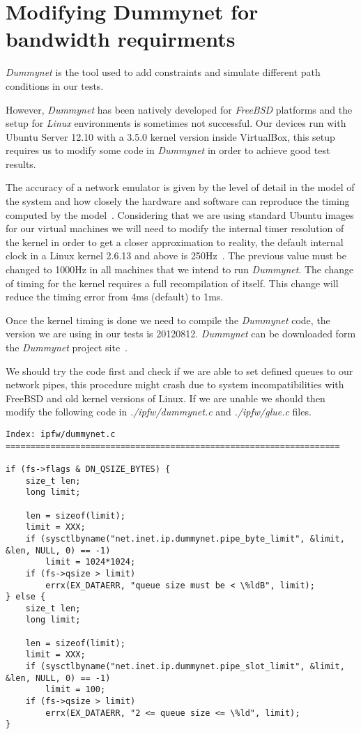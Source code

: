 \section{Modifying Dummynet for bandwidth requirments}
\label{sec:dummynet}

\thispagestyle{empty}

{\it Dummynet} is the tool used to add constraints and simulate different path conditions in our tests. 

However, {\it Dummynet} has been natively developed for {\it FreeBSD} platforms and the setup for {\it Linux} environments is sometimes not successful. Our devices run with Ubuntu Server 12.10 with a 3.5.0 kernel version inside VirtualBox, this setup requires us to modify some code in {\it Dummynet} in order to achieve good test results.

The accuracy of a network emulator is given by the level of detail in the model of the system and how closely the hardware and software can reproduce the timing computed by the model~\cite{dummynetRevisited}. Considering that we are using standard Ubuntu images for our virtual machines we will need to modify the internal timer resolution of the kernel in order to get a closer approximation to reality, the default internal clock in a Linux kernel  2.6.13 and above is 250Hz~\cite{linuxKernelTime}. The previous value must be changed to 1000Hz in all machines that we intend to run {\it Dummynet}. The change of timing for the kernel requires a full recompilation of itself. This change will reduce the timing error from 4ms (default) to 1ms.

Once the kernel timing is done we need to compile the {\it Dummynet} code, the version we are using in our tests is 20120812. {\it Dummynet} can be downloaded form the {\it Dummynet} project site~\cite{dummynetTool}.

We should try the code first and check if we are able to set defined queues to our network pipes, this procedure might crash due to system incompatibilities with FreeBSD and old kernel versions of Linux.  If we are unable we should then modify the following code in {\it ./ipfw/dummynet.c} and {\it ./ipfw/glue.c} files.

\lstset{language=C}
\begin{lstlisting}
Index: ipfw/dummynet.c
===================================================================

if (fs->flags & DN_QSIZE_BYTES) {
	size_t len;
	long limit;

	len = sizeof(limit);
	limit = XXX;
	if (sysctlbyname("net.inet.ip.dummynet.pipe_byte_limit", &limit, &len, NULL, 0) == -1)
		limit = 1024*1024;
	if (fs->qsize > limit)
		errx(EX_DATAERR, "queue size must be < \%ldB", limit);
} else {
	size_t len;
	long limit;

	len = sizeof(limit);
	limit = XXX;
	if (sysctlbyname("net.inet.ip.dummynet.pipe_slot_limit", &limit, &len, NULL, 0) == -1)
		limit = 100;
	if (fs->qsize > limit)
		errx(EX_DATAERR, "2 <= queue size <= \%ld", limit);
}
\end{lstlisting}

